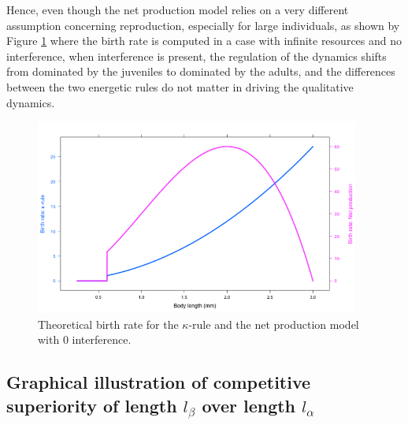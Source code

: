 Hence, even though the net production model relies on a very different
assumption concerning reproduction, especially for large individuals, as shown
by Figure \ref{Fig4-SM11} where the birth rate is computed in a case with
infinite resources and no interference, when interference is present, the regulation of
the dynamics shifts from dominated by the juveniles to dominated by the adults,
and the differences between the two energetic rules do not matter in driving the
qualitative dynamics.

\begin{figure}[!h] %
\centering
\includegraphics[width=0.95\textwidth]{4_ChapThe1/Fig/FigSM11}
\caption[Theoretical birth rate for the $\kappa$-rule and the net production model with
$0$ interference]{
Theoretical birth rate for the $\kappa$-rule and the net production model with
$0$ interference.}
\label{Fig4-SM11}
\end{figure}

\subsection{Graphical illustration of competitive superiority of length
\texorpdfstring{$l_{\beta}$}{l_beta} over length
\texorpdfstring{$l_{\alpha}$}{l_alpha}}\label{subsec:SupMat5}

